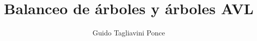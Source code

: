 \documentclass[11pt,a4paper]{article}
\author{Guido Tagliavini Ponce}
\title{\LARGE{\textbf{Balanceo de \'arboles y \'arboles AVL}}}
\theoremstyle{definition}
\begin{document}

\tableofcontents









\nocite{*}



\end{document}
